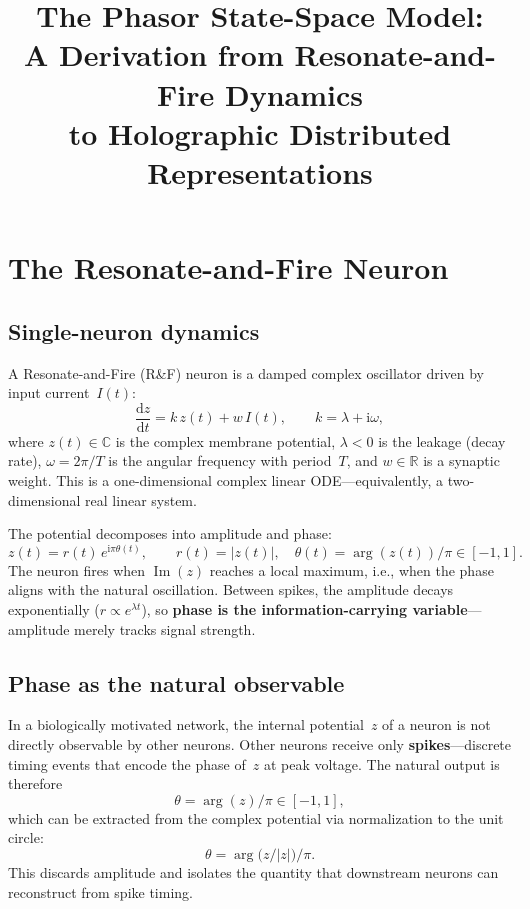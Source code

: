 \documentclass[11pt]{article}
\title{The Phasor State-Space Model:\\
A Derivation from Resonate-and-Fire Dynamics\\
to Holographic Distributed Representations}
\author{}
\date{}
\newcommand{\R}{\mathbb{R}}
\newcommand{\C}{\mathbb{C}}
\newcommand{\im}{\mathrm{i}}
\newcommand{\dd}{\mathrm{d}}
\newcommand{\ie}{i.e.}
\theoremstyle{definition}
\begin{document}
\maketitle

\section{The Resonate-and-Fire Neuron}\label{sec:rf}

\subsection{Single-neuron dynamics}

A Resonate-and-Fire (R\&F) neuron is a damped complex oscillator driven by
input current~$I(t)$:
\begin{equation}\label{eq:rf-ode}
  \frac{\dd z}{\dd t} = k\,z(t) + w\,I(t),
  \qquad k = \lambda + \im\omega,
\end{equation}
where $z(t)\in\C$ is the complex membrane potential,
$\lambda<0$ is the leakage (decay rate),
$\omega = 2\pi/T$ is the angular frequency with period~$T$, and
$w\in\R$ is a synaptic weight.
This is a one-dimensional complex linear ODE---equivalently, a
two-dimensional real linear system.

The potential decomposes into amplitude and phase:
\begin{equation}
  z(t) = r(t)\,e^{\im\pi\theta(t)},
  \qquad r(t) = |z(t)|,
  \quad \theta(t) = \arg(z(t))/\pi \in [-1,1].
\end{equation}
The neuron fires when $\operatorname{Im}(z)$ reaches a local maximum,
\ie, when the phase aligns with the natural oscillation.
Between spikes, the amplitude decays exponentially ($r\propto e^{\lambda t}$),
so \textbf{phase is the information-carrying variable}---amplitude merely
tracks signal strength.

\subsection{Phase as the natural observable}

In a biologically motivated network, the internal potential~$z$ of a neuron
is not directly observable by other neurons. Other neurons receive only
\textbf{spikes}---discrete timing events that encode the phase of~$z$ at
peak voltage. The natural output is therefore
\begin{equation}\label{eq:phase-readout}
  \theta = \arg(z)/\pi \in [-1,1],
\end{equation}
which can be extracted from the complex potential via normalization to the
unit circle:
\[
  \theta = \arg\!\bigl(z/|z|\bigr)/\pi.
\]
This discards amplitude and isolates the quantity that downstream neurons
can reconstruct from spike timing.
\end{document}
